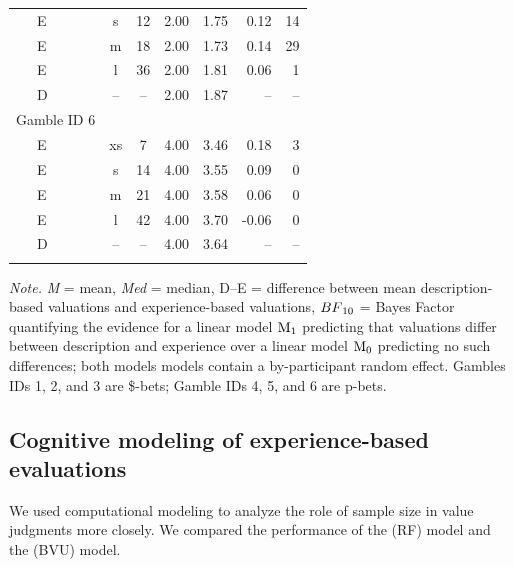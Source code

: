 \documentclass[a4paper, man, floatsintext]{apa6}
\begin{document}
\begin{table}[tbp]
\begin{center}
\begin{threeparttable}
\begin{tabular}{lccccrr}
\ \ \ E & s & 12 & 2.00 & 1.75 & 0.12 & 14\\
\ \ \ E & m & 18 & 2.00 & 1.73 & 0.14 & 29\\
\ \ \ E & l & 36 & 2.00 & 1.81 & 0.06 & 1\\
\ \ \ D & -- & -- & 2.00 & 1.87 & -- & --\\
Gamble ID 6 &  &  &  &  &  & \\
\ \ \ E & xs & 7 & 4.00 & 3.46 & 0.18 & 3\\
\ \ \ E & s & 14 & 4.00 & 3.55 & 0.09 & 0\\
\ \ \ E & m & 21 & 4.00 & 3.58 & 0.06 & 0\\
\ \ \ E & l & 42 & 4.00 & 3.70 & -0.06 & 0\\
\ \ \ D & -- & -- & 4.00 & 3.64 & -- & --\\
\bottomrule
\addlinespace
\end{tabular}
\begin{tablenotes}[para]
\normalsize{\textit{Note.} \textit{M} = mean, \textit{Med} = median, D--E = difference between mean description-based valuations and experience-based valuations, $BF\textsubscript{10}$ = Bayes Factor quantifying the evidence for a linear model $\mathrm{M}\textsubscript{1}$ predicting that valuations differ between description and experience over a linear model $\mathrm{M}\textsubscript{0}$ predicting no such differences; both models models contain a by-participant random effect. Gambles IDs 1, 2, and 3 are \$-bets; Gamble IDs 4, 5, and 6 are p-bets.}
\end{tablenotes}
\end{threeparttable}
\end{center}
\end{table}

\subsection{Cognitive modeling of experience-based evaluations}

We used computational modeling to analyze the role of sample size in
value judgments more closely. We compared the performance of the
 (RF) model and the
 (BVU) model.
\end{document}
